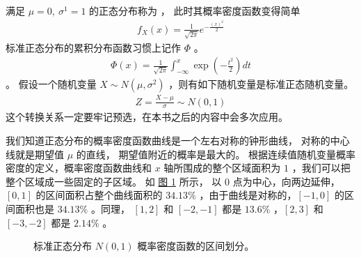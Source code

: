 \documentclass[letterpaper,10pt,english]{sphinxmanual}
\begin{document}
满足 \(\mu=0,\ \sigma^1=1\) 的正态分布称为 ，
此时其概率密度函数变得简单
\begin{equation}\label{equation:概率基础/content:概率基础/content:71}
\begin{split}f_X(x) = \frac{1}{\sqrt{2\pi }} e^{-\frac{(x)^2}{2} }\end{split}
\end{equation}
标准正态分布的累积分布函数习惯上记作 \(\Phi\) 。
\begin{equation}\label{equation:概率基础/content:概率基础/content:72}
\begin{split}\Phi(x)= \frac{1}{\sqrt{2\pi }} \int_{-\infty}^x  \exp \left ( -\frac{t^2}{2 } \right ) dt\end{split}
\end{equation}
。
假设一个随机变量 \(X \sim N(\mu,\sigma^2)\)
，则有如下随机变量是标准正态随机变量。
\begin{equation}\label{equation:概率基础/content:概率基础/content:73}
\begin{split}Z = \frac{X-\mu}{\sigma} \sim N(0,1)\end{split}
\end{equation}
这个转换关系一定要牢记预选，在本书之后的内容中会多次应用。

我们知道正态分布的概率密度函数曲线是一个左右对称的钟形曲线，
对称的中心线就是期望值 \(\mu\) 的直线，
期望值附近的概率是最大的。
根据连续值随机变量概率密度的定义，概率密度函数曲线和 \(x\) 轴所围成的整个区域面积为 \(1\)
，我们可以把整个区域成一些固定的子区域。
如 \hyperref[\detokenize{_u6982_u7387_u57fa_u7840/content:fg-probability-008}]{图 \ref{\detokenize{_u6982_u7387_u57fa_u7840/content:fg-probability-008}}} 所示，
以 \(0\) 点为中心，向两边延伸，
\([0,1]\) 的区间面积占整个曲线面积的 \(34.13\%\)
，由于曲线是对称的，\([-1,0]\) 的区间面积也是 \(34.13\%\)
。同理， \([1,2]\) 和 \([-2,-1]\) 都是 \(13.6\%\)
，\([2,3]\) 和 \([-3,-2]\) 都是 \(2.14\%\)
。

\begin{figure}[htbp]
\centering
\capstart

\noindent{}
\caption{标准正态分布 \(N(0,1)\) 概率密度函数的区间划分。}\label{\detokenize{_u6982_u7387_u57fa_u7840/content:id29}}\label{\detokenize{_u6982_u7387_u57fa_u7840/content:fg-probability-008}}\end{figure}
\end{document}
